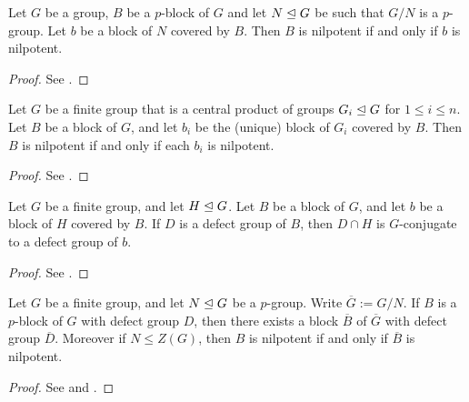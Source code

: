 \documentclass[bysection, amsart]{standard}
\begin{document}
\begin{lemma} \label{lm:idxp-nilpotent}
    Let $G$ be a group, $B$ be a $p$-block of $G$ and let $N \trianglelefteq G$ be such that $G/N$ is a $p$-group. Let $b$ be a block of $N$ covered by $B$. Then $B$ is nilpotent if and only if $b$ is nilpotent.
\end{lemma}
\begin{proof}
    See \cite[Proposition 6.5]{paper:kulshammer-puig}.
\end{proof}

\begin{lemma} \label{lm:cen-prod-nilpotent}
    Let $G$ be a finite group that is a central product of groups $G_i \trianglelefteq G$ for $1 \leq i \leq n$. Let $B$ be a block of $G$, and let $b_i$ be the (unique) block of $G_i$ covered by $B$. Then $B$ is nilpotent if and only if each $b_i$ is nilpotent.
\end{lemma}
\begin{proof}
    See \cite[Lemma 7]{paper:ekb-block-mna}.
\end{proof}

\begin{lemma}
    Let $G$ be a finite group, and let $H \trianglelefteq G$. Let $B$ be a block of $G$, and let $b$ be a block of $H$ covered by $B$. If $D$ is a defect group of $B$, then $D \cap H$ is $G$-conjugate to a defect group of $b$.
\end{lemma}
\begin{proof}
    See \cite[Theorem 15.1]{book:alperin-local-rep-theory}.
\end{proof}

\begin{proposition} \label{prp:block-domination}
    Let $G$ be a finite group, and let $N \trianglelefteq G$ be a $p$-group. Write $\overline{G} := G/N$. If $B$ is a $p$-block of $G$ with defect group $D$, then there exists a block $\overline{B}$ of $\overline{G}$ with defect group $\overline{D}$. Moreover if $N \leq Z(G)$, then $B$ is nilpotent if and only if $\overline{B}$ is nilpotent.
\end{proposition}
\begin{proof}
    See \cite[Theorem 9.9 (b)]{book:navarro} and \cite[Lemma 2]{paper:nilpotent-dom}.
\end{proof}

\end{document}
